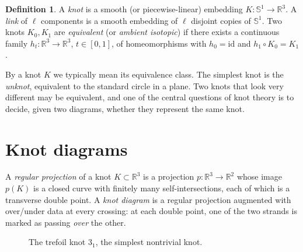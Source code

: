 \documentclass[11pt,oneside]{report}
\theoremstyle{definition}
\newtheorem{definition}[theorem]{Definition}
\newcommand{\R}{\mathbb{R}}
\newcommand{\bbS}{\mathbb{S}}
\begin{document}
\begin{definition}
A \emph{knot} is a smooth (or piecewise-linear) embedding $K \colon \bbS^1 \to \R^3$.
A \emph{link} of $\ell$ components is a smooth embedding of $\ell$ disjoint
copies of $\bbS^1$. Two knots $K_0, K_1$ are \emph{equivalent} (or
\emph{ambient isotopic}) if there exists a continuous family
$h_t \colon \R^3 \to \R^3$, $t \in [0,1]$, of homeomorphisms with $h_0 = \mathrm{id}$
and $h_1 \circ K_0 = K_1$.
\end{definition}

By a knot $K$ we typically mean its equivalence class. The simplest knot is the
\emph{unknot}, equivalent to the standard circle in a plane. Two knots that
look very different may be equivalent, and one of the central questions of
knot theory is to decide, given two diagrams, whether they represent the same
knot.

\section{Knot diagrams}

A \emph{regular projection} of a knot $K \subset \R^3$ is a projection
$p \colon \R^3 \to \R^2$ whose image $p(K)$ is a closed curve with finitely many
self-intersections, each of which is a transverse double point. A
\emph{knot diagram} is a regular projection augmented with over/under data at
every crossing: at each double point, one of the two strands is marked as
passing \emph{over} the other.

\begin{figure}[h]
\centering
{}
\caption{The trefoil knot $3_1$, the simplest nontrivial knot.}
\end{figure}
\end{document}
